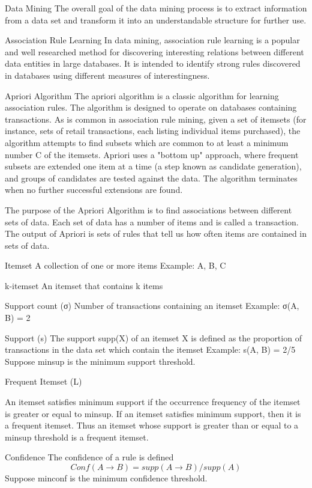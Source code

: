 Data Mining
The overall goal of the data mining process is to extract information from a data set and transform it into an understandable structure for further use.

Association Rule Learning
In data mining, association rule learning is a popular and well researched method for discovering interesting relations between different data entities in large databases.
It is intended to identify strong rules discovered in databases using different measures of interestingness.

Apriori Algorithm
The apriori algorithm is a classic algorithm for learning association rules. The
 algorithm is designed to operate on databases containing transactions. As is
common in association rule mining, given a set of itemsets (for instance, sets
of retail transactions, each listing individual items purchased), the algorithm
attempts to find subsets which are common to at least a minimum number C of the
itemsets. Apriori uses a "bottom up" approach, where frequent subsets are
extended one item at a time (a step known as candidate generation), and groups
of candidates are tested against the data. The algorithm terminates when no
further successful extensions are found.

The purpose of the Apriori Algorithm is to find associations between different sets of data.
Each set of data has a number of items and is called a transaction.
The output of Apriori is sets of rules that tell us how often items are contained in sets of data.


Itemset
A collection of one or more items
Example: {A, B, C}

k-itemset
An itemset that contains k items


Support count (σ)
Number of transactions containing an itemset
Example: σ({A, B}) = 2


Support (s)
The support supp(X) of an itemset X is defined as the proportion of transactions in the data set which contain the itemset
Example: s({A, B}) = 2/5
Suppose minsup is the minimum support threshold.

Frequent Itemset (L)

An itemset satisfies minimum support if the occurrence frequency of the itemset
is greater or equal to minsup. If an itemset satisfies minimum support, then it is a frequent itemset.
Thus an itemset whose support is greater than or equal to a minsup threshold is a frequent itemset.


Confidence
The confidence of a rule is defined
\begin{equation}
Conf(A \rightarrow B) = supp(A \rightarrow B) / supp(A)
\end{equation}
Suppose minconf is the minimum confidence threshold.


